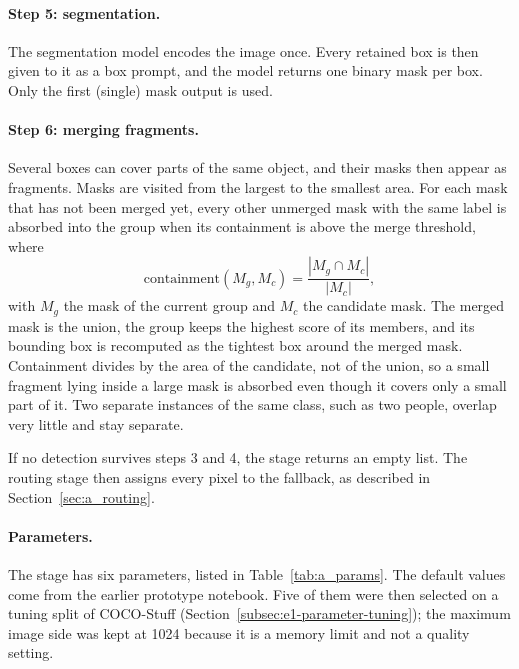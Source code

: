 \documentclass{FastFyp}
\begin{document}
\paragraph{Step 5: segmentation.} The segmentation model encodes the image once. Every retained box is then given to it as a box prompt, and the model returns one binary mask per box. Only the first (single) mask output is used.
 
\paragraph{Step 6: merging fragments.} Several boxes can cover parts of the same object, and their masks then appear as fragments. Masks are visited from the largest to the smallest area. For each mask that has not been merged yet, every other unmerged mask with the same label is absorbed into the group when its containment is above the merge threshold, where
\begin{equation}
\mathrm{containment}(M_g, M_c)=\frac{|M_g\cap M_c|}{|M_c|},
\end{equation}
with $M_g$ the mask of the current group and $M_c$ the candidate mask. The merged mask is the union, the group keeps the highest score of its members, and its bounding box is recomputed as the tightest box around the merged mask. Containment divides by the area of the candidate, not of the union, so a small fragment lying inside a large mask is absorbed even though it covers only a small part of it. Two separate instances of the same class, such as two people, overlap very little and stay separate.
 
If no detection survives steps 3 and 4, the stage returns an empty list. The routing stage then assigns every pixel to the fallback, as described in Section~\ref{sec:a_routing}.
 
\paragraph{Parameters.} The stage has six parameters, listed in Table~\ref{tab:a_params}. The default values come from the earlier prototype notebook. Five of them were then selected on a tuning split of COCO-Stuff (Section~\ref{subsec:e1-parameter-tuning}); the maximum image side was kept at 1024 because it is a memory limit and not a quality setting.
\end{document}
